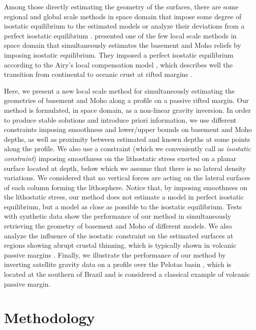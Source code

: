 \documentclass[manuscript]{geophysics}
\begin{document}
Among those directly estimating the geometry of the surfaces, 
there are some regional and global scale methods in space domain that impose 
some degree of isostatic equilibrium to the estimated models 
\citep[e.g.,][]{sunkel1985, sjoberg2009, bagherbandi-eshagh2012, sampietro2015}
or analyze their deviations from a perfect isostatic equilibrium
\citep[e.g.,][]{shin-etal2009}.
\citet{salem-etal2014} presented one of the few local scale 
methods in space domain that simultaneously estimates the basement and Moho
reliefs by imposing isostatic equilibrium. 
They imposed a perfect isostatic equilibrium according to
the Airy's local compensation model \citep{turcotte-schubert2002}, 
which describes well the transition
from continental to oceanic crust at rifted margins 
\citep{worzel1968, watts-moore2017}.

Here, we present a new local scale method for simultaneously estimating the geometries
of basement and Moho along a profile on a passive rifted margin.
Our method is formulated, in space domain, as a non-linear gravity inversion.
In order to produce stable solutions and introduce priori information,
we use different constraints imposing smoothness and lower/upper 
bounds on basement and Moho depths, as well as proximity between estimated 
and known depths at some points along the profile. We also use a constraint
(which we conveniently call as \textit{isostatic constraint}) imposing smoothness
on the lithostatic stress exerted on a planar surface located at depth,
below which we assume that there is no lateral density variations.
We considered that no vertical forces are acting on the lateral surfaces of 
each column forming the lithosphere.
Notice that, by imposing smoothness on the lithostatic stress,
our method does not estimate a model in perfect isostatic equilibrium, 
but a model as close as possible to the isostatic equilibrium.
Tests with synthetic data show the performance of our method in simultaneously
retrieving the geometry of basement and Moho of different models. 
We also analyze the influence of the isostatic constraint on the estimated
surfaces at regions showing abrupt crustal thinning, which is
typically shown in volcanic passive margins \citep{geoffroy2005}.
Finally, we illustrate the performance of our method by inverting 
satellite gravity data on a profile over the Pelotas basin \citep{stica-etal2014}, 
which is located at the southern of Brazil and is considered a classical example 
of volcanic passive margin.


\section{Methodology}
\end{document}
